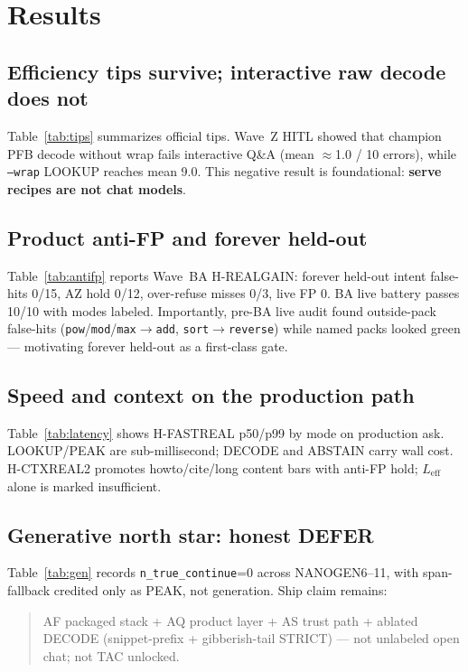\section{Results}
\label{sec:results}

\subsection{Efficiency tips survive; interactive raw decode does not}
Table~\ref{tab:tips} summarizes official tips.
Wave~Z HITL showed that champion PFB decode without wrap fails interactive Q\&A
(mean $\approx$1.0 / 10 errors), while \texttt{--wrap} LOOKUP reaches mean 9.0.
This negative result is foundational: \textbf{serve recipes are not chat models}.



\subsection{Product anti-FP and forever held-out}
Table~\ref{tab:antifp} reports Wave~BA H-REALGAIN: forever held-out intent
false-hits 0/15, AZ hold 0/12, over-refuse misses 0/3, live FP 0.
BA live battery passes 10/10 with modes labeled.
Importantly, pre-BA live audit found outside-pack false-hits
(\texttt{pow}/\texttt{mod}/\texttt{max}$\rightarrow$\texttt{add},
\texttt{sort}$\rightarrow$\texttt{reverse}) while named packs looked green ---
motivating forever held-out as a first-class gate.



\subsection{Speed and context on the production path}
Table~\ref{tab:latency} shows H-FASTREAL p50/p99 by mode on production ask.
LOOKUP/PEAK are sub-millisecond; DECODE and ABSTAIN carry wall cost.
H-CTXREAL2 promotes howto/cite/long content bars with anti-FP hold;
$L_{\mathrm{eff}}$ alone is marked insufficient.



\subsection{Generative north star: honest DEFER}
Table~\ref{tab:gen} records \texttt{n\_true\_continue}=0 across NANOGEN6--11,
with span-fallback credited only as PEAK, not generation.
Ship claim remains:
\begin{quote}
AF packaged stack + AQ product layer + AS trust path + ablated DECODE
(snippet-prefix + gibberish-tail STRICT) --- not unlabeled open chat;
not TAC unlocked.
\end{quote}

